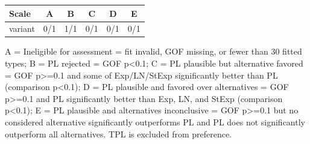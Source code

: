 \begin{tabular}{lccccc}
\toprule
Scale & \cellcolor[HTML]{FFFFFF} A & \cellcolor[HTML]{EA4646} B & \cellcolor[HTML]{9670BD} C & \cellcolor[HTML]{8FEB32} D & \cellcolor[HTML]{19C8C8} E \\
\midrule
variant & \cellcolor[HTML]{FFFFFF} 0/1 & \cellcolor[HTML]{EA4646} 1/1 & \cellcolor[HTML]{9670BD} 0/1 & \cellcolor[HTML]{8FEB32} 0/1 & \cellcolor[HTML]{19C8C8} 0/1 \\
\bottomrule
\end{tabular}
\begin{flushleft}\footnotesize A = Ineligible for assessment = fit invalid, GOF missing, or fewer than 30 fitted types; B = PL rejected = GOF p<0.1; C = PL plausible but alternative favored = GOF p>=0.1 and some of Exp/LN/StExp significantly better than PL (comparison p<0.1); D = PL plausible and favored over alternatives = GOF p>=0.1 and PL significantly better than Exp, LN, and StExp (comparison p<0.1); E = PL plausible and alternatives inconclusive = GOF p>=0.1 but no considered alternative significantly outperforms PL and PL does not significantly outperform all alternatives. TPL is excluded from preference.\end{flushleft}
